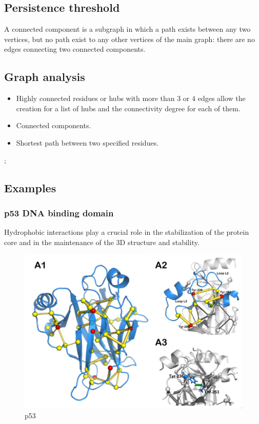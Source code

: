 		\subsection{Persistence threshold}
		A connected component is a subgraph in which a path exists between any two vertices, but no path exist to any other vertices of the main graph: there are no edges connecting two connected components.

	\subsection{Graph analysis}

	\begin{itemize}
		\item Highly connected residues or hubs with more than $3$ or $4$ edges allow the creation for a list of hubs and the connectivity degree for each of them.
		\item Connected components.
		\item Shortest path between two specified residues.
	\end{itemize};

	\subsection{Examples}

		\subsubsection{p53 DNA binding domain}
		Hydrophobic interactions play a crucial role in the stabilization of the protein core and in the maintenance of the 3D structure and stability.

		\begin{figure}[H]
			\includegraphics[width=\textwidth]{p53}
			\caption{p53}
			\label{fig:p53}
		\end{figure}

